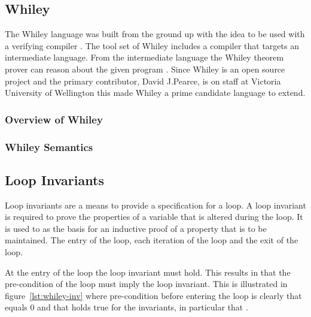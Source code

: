 \subsection{Whiley}

The Whiley language was built from the ground up with the idea to be used with
a verifying compiler \cite{whiley-origin}.
The tool set of Whiley includes a compiler that targets an intermediate
language. From the intermediate language the Whiley theorem prover can reason
about the given program \cite{whiley-design} \cite{whiley-origin}.
Since Whiley is an open source project and the primary contributor, David
J.Pearce, is on staff at Victoria University of Wellington this made Whiley a
prime candidate language to extend.

\subsubsection{Overview of Whiley}

\subsubsection{Whiley Semantics}


\cite{whiley-design}
\cite{whiley-arrays}


\subsection{Loop Invariants}
%

Loop invariants are a means to provide a specification for a loop.
A loop invariant is required to prove the properties of a variable
that is altered during the loop.
It is used to as the basis for an inductive proof of a
property that is to be maintained.
The entry of the loop, each iteration of the loop and the exit of the
loop.

At the entry of the loop the loop invariant must hold.
This results in that the pre-condition of the loop must imply
the loop invariant.
This is illustrated in figure~\ref{lst:whiley-inv} where pre-condition
before entering the loop is clearly that  equals 0 and that holds
true for the invariants, in particular that .

